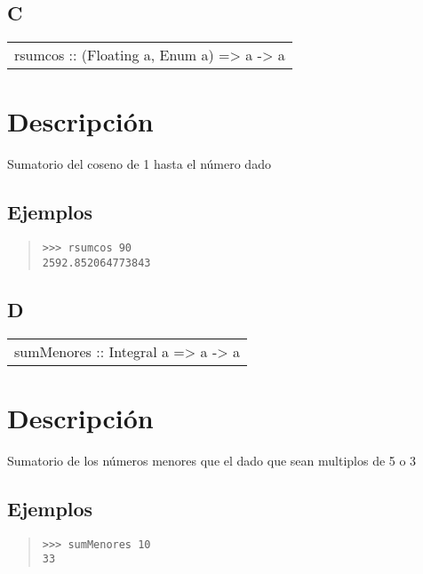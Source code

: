 \subsection{C}
\begin{haddockdesc}
\item[\begin{tabular}{@{}l}
rsumcos :: (Floating a, Enum a) => a -> a
\end{tabular}]
{\haddockbegindoc
\section*{Descripción}
Sumatorio del coseno de 1 hasta el número dado\par
\subsection*{Ejemplos}
\begin{quote}
{\haddockverb\begin{verbatim}
>>> rsumcos 90
2592.852064773843

\end{verbatim}}
\end{quote}}
\end{haddockdesc}
\subsection{D}
\begin{haddockdesc}
\item[\begin{tabular}{@{}l}
sumMenores :: Integral a => a -> a
\end{tabular}]
{\haddockbegindoc
\section*{Descripción}
Sumatorio de los números menores que el dado que sean multiplos de 5 o 3\par
\subsection*{Ejemplos}
\begin{quote}
{\haddockverb\begin{verbatim}
>>> sumMenores 10
33

\end{verbatim}}
\end{quote}}
\end{haddockdesc}
